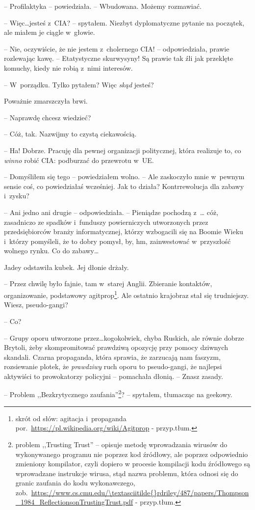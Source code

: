 \documentclass[oneside,polish,12pt,sfheadings]{mwbk}
\begin{document}
-- Profilaktyka -- powiedziała. -- Wbudowana. Możemy rozmawiać.

-- Więc\ldots jesteś z~CIA? -- spytałem. Niezbyt dyplomatyczne pytanie na
początek, ale miałem je ciągle w~głowie.

-- Nie, oczywiście, że nie jestem z~cholernego CIA! -- odpowiedziała,
prawie rozlewając kawę. -- Etatystyczne skurwysyny! Są prawie tak źli jak
przeklęte komuchy, kiedy nie robią z~nimi interesów.

-- W~porządku. Tylko pytałem? Więc \emph{skąd} jesteś?

Poważnie zmarszczyła brwi. 

-- Naprawdę chcesz wiedzieć?

-- Cóż, tak. Nazwijmy to czystą ciekawością.

-- Ha! Dobrze. Pracuję dla pewnej organizacji politycznej, która
realizuje to, co \emph{winno} robić CIA: podburzać do przewrotu w~UE.

-- Domyśliłem się tego -- powiedziałem wolno. -- Ale zaskoczyło mnie w~pewnym sensie coś, co powiedziałaś wcześniej. Jak to działa?
Kontrrewolucja dla zabawy i~zysku?

-- Ani jedno ani drugie -- odpowiedziała. -- Pieniądze pochodzą z~\ldots
cóż, zasadniczo ze spadków i~funduszy powierniczych utworzonych przez
przedsiębiorców branży informatycznej, którzy wzbogacili się na Boomie
Wieku i~którzy pomyśleli, że to dobry pomysł, by, hm, zainwestować w~przyszłość wolnego rynku. Co do zabawy\ldots

Jadey odstawiła kubek. Jej dłonie drżały. 

-- Przez chwilę było fajnie,
tam w~starej Anglii. Zbieranie kontaktów, organizowanie, podstawowy
agitprop\footnote{skrót od słów: agitacja i~propaganda
por.~\url{https://pl.wikipedia.org/wiki/Agitprop} - przyp.tłum.}. Ale
ostatnio krajobraz stał się trudniejszy. Wiesz, pseudo-gangi?

-- Co?

-- Grupy oporu utworzone przez\ldots kogokolwiek, chyba Ruskich, ale równie
dobrze Brytoli, żeby skompromitować prawdziwą opozycję przy pomocy
dziwnych skandali. Czarna propaganda, która sprawia, że zarzucają nam
faszyzm, rozsiewanie plotek, że \emph{prawdziwy} ruch oporu to
pseudo-gangi, że najlepsi aktywiści to prowokatorzy policyjni -- pomachała dłonią. -- Znasz zasady.

-- Problem ,,Bezkrytycznego zaufania''\footnote{problem ,,Trusting Trust'' -- opisuje metodę wprowadzania wirusów do wykonywanego programu nie poprzez kod
źródłowy, ale poprzez odpowiednio zmieniony kompilator, czyli dopiero w procesie kompilacji kodu źródłowego są wprowadzane instrukcje wirusa, stąd nazwa
problemu, która odnosi się do granic zaufania do
kodu wykonawczego, zob.~\url{https://www.cs.cmu.edu/\textasciitilde{}rdriley/487/papers/Thompson\_1984\_ReflectionsonTrustingTrust.pdf}
- przyp.tłum.}? -- spytałem, tłumacząc na geekowy.
\end{document}
